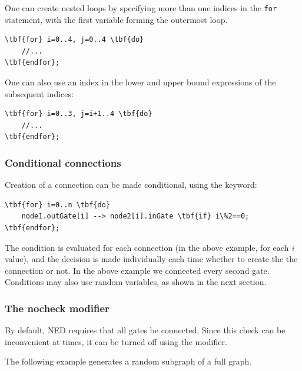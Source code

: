 One can create nested loops
by specifying more than one indices in the \texttt{for} statement,
with the first variable forming the outermost loop.

\begin{Verbatim}[commandchars=\\\{\}]
\tbf{for} i=0..4, j=0..4 \tbf{do}
    //...
\tbf{endfor};
\end{Verbatim}

One can also use an index in the lower and upper bound expressions
of the subsequent indices:

\begin{Verbatim}[commandchars=\\\{\}]
\tbf{for} i=0..3, j=i+1..4 \tbf{do}
    //...
\tbf{endfor};
\end{Verbatim}


\subsubsection{Conditional connections}


Creation of a connection can be made conditional, using the 
keyword:


\begin{Verbatim}[commandchars=\\\{\}]
\tbf{for} i=0..n \tbf{do}
    node1.outGate[i] --> node2[i].inGate \tbf{if} i\%2==0;
\tbf{endfor};
\end{Verbatim}

The  condition is evaluated for each connection
(in the above example, for each \textit{i} value), and the
decision is made individually each time whether to create the
the connection or not. In the above example we connected every
second gate. Conditions may also use random variables, as
shown in the next section.


\subsubsection{The nocheck modifier}

By default, NED requires that all gates be connected. Since this
check can be inconvenient at times, it can be turned off
using the  modifier.

The following example generates a random subgraph of a full graph.

